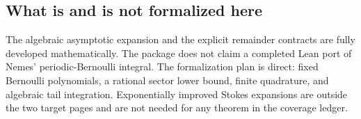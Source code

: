 \subsection{What is and is not formalized here}

The algebraic asymptotic expansion and the explicit remainder contracts are
fully developed mathematically.  The package does not claim a completed Lean
port of Nemes' periodic-Bernoulli integral.  The formalization plan is direct:
fixed Bernoulli polynomials, a rational sector lower bound, finite quadrature,
and algebraic tail integration.  Exponentially improved Stokes expansions are
outside the two target pages and are not needed for any theorem in the coverage
ledger.
